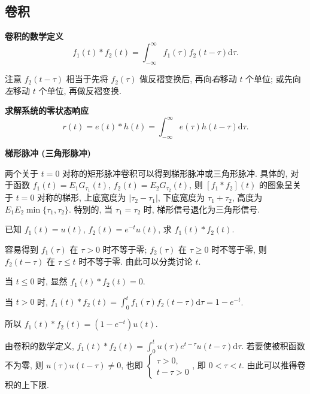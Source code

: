 \subsection{卷积} \label{2 卷积}

\textbf{卷积的数学定义}
\begin{equation} \label{eq:2.5 conv}
    f_1(t)*f_2(t)=\int_{-\infty}^{\infty}f_1(\tau)f_2(t-\tau)\mathrm{d}\tau.
\end{equation}

注意 $f_2(t-\tau)$ 相当于先将 $f_2(\tau)$ 做反褶变换后, 再向\textit{右}移动 $t$ 个单位; 或先向\textit{左}移动 $t$ 个单位, 再做反褶变换.

\textbf{求解系统的零状态响应}
\begin{equation}
    r(t)=e(t)*h(t)=\int_{-\infty}^{\infty}e(\tau)h(t-\tau)\mathrm{d}\tau.
\end{equation}

\textbf{梯形脉冲 (三角形脉冲)} \label{2.5 梯形脉冲 (三角形脉冲)}

两个关于 $t=0$ 对称的矩形脉冲卷积可以得到梯形脉冲或三角形脉冲. 具体的, 对于函数 $f_1(t)=E_1G_{\tau_1}(t)$, $f_2(t)=E_2G_{\tau_2}(t)$, 则 $[f_1*f_2](t)$ 的图象呈关于 $t=0$ 对称的梯形, 上底宽度为 $|\tau_2-\tau_1|$, 下底宽度为 $\tau_1+\tau_2$, 高度为 $E_1E_2\min\{\tau_1, \tau_2\}$. 特别的, 当 $\tau_1=\tau_2$ 时, 梯形信号退化为三角形信号.

\begin{exampleprob}
    已知 $f_1(t)=u(t)$, $f_2(t)=e^{-t}u(t)$, 求 $f_1(t)*f_2(t)$.

    \begin{solution}[1]
        容易得到 $f_1(\tau)$ 在 $\tau>0$ 时不等于零; $f_2(\tau)$ 在 $\tau\geq 0$ 时不等于零, 则 $f_2(t-\tau)$ 在 $\tau\leq t$ 时不等于零. 由此可以分类讨论 $t$.

        当 $t\leq 0$ 时, 显然 $f_1(t)*f_2(t)=0$.

        当 $t>0$ 时, $f_1(t)*f_2(t)=\displaystyle\int_{0}^{t}f_1(\tau)f_2(t-\tau)\mathrm{d}\tau=1-e^{-t}$.

        所以 $f_1(t)*f_2(t)=(1-e^{-t})u(t)$.
    \end{solution}

    \begin{solution}[2]
        由卷积的数学定义, $f_1(t)*f_2(t)=\displaystyle\int_{0}^{t}u(\tau)e^{t-\tau}u(t-\tau)\mathrm{d}\tau$. 若要使被积函数不为零, 则 $u(\tau)u(t-\tau)\neq 0$, 也即 $\begin{cases}
                \tau>0, \\
                t-\tau>0
            \end{cases}$, 即 $0<\tau<t$. 由此可以推得卷积的上下限.
    \end{solution}
\end{exampleprob}


